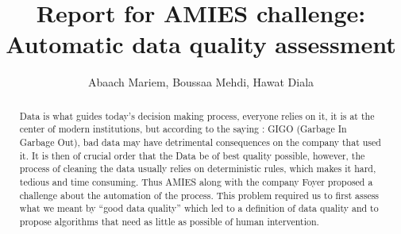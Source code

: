 \documentclass{article}
\title{\Large Report for AMIES challenge: Automatic data quality assessment}
\author{Abaach Mariem, Boussaa Mehdi, Hawat Diala}
\date{}
\begin{document}
\maketitle

\begin{abstract}
Data is what guides today's decision making process, everyone relies on it, it is at the center of modern institutions, but according to the saying : GIGO (Garbage In Garbage Out), bad data may have detrimental consequences on the company that used it.  It is then of crucial order that the Data be of best quality possible, however, the process of cleaning the data usually relies on deterministic rules, which makes it hard, tedious and time consuming. Thus AMIES along with the company Foyer proposed a challenge about the automation of the process. This problem required us to first assess what we meant by ``good data quality'' which led to a definition of data quality and to propose algorithms that need as little as possible of human intervention. 
\end{abstract}
\end{document}

